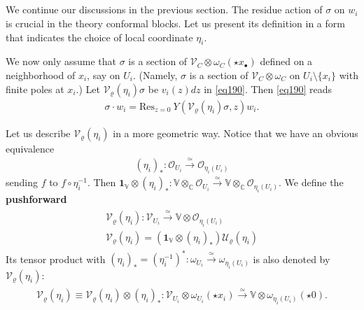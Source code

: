 \documentclass[11pt,b5paper,notitlepage]{article}
\theoremstyle{definition}
\theoremstyle{plain}
\newcommand{\mc}{\mathcal}
\newcommand{\id}{\mathbf{1}}
\newcommand{\Res}{\mathrm{Res}}
\newcommand{\scr}{\mathscr}
\newcommand{\blt}{\bullet}
\newcommand{\Vbb}{\mathbb V}
\newcommand{\Cbb}{\mathbb C}
\numberwithin{equation}{section}
\begin{document}
\subsection{}\label{lb105}


We continue our discussions in the previous section. The residue action of $\sigma$ on $w_i$ is crucial in the theory conformal blocks. Let us present its definition in a form that indicates the choice of local coordinate $\eta_i$.



We now only assume that $\sigma$ is a section of $\scr V_C\otimes\omega_C(\star x_\blt)$ defined on a neighborhood of $x_i$, say on $U_i$. (Namely, $\sigma$ is a section of $\scr V_C\otimes\omega_C$ on $U_i\setminus\{x_i\}$ with finite poles at $x_i$.) Let $\mc V_\varrho(\eta_i)\sigma$ be $v_i(z)dz$ in \eqref{eq190}. Then \eqref{eq190} reads
\begin{gather}
\sigma\cdot w_i=\Res_{z=0} ~Y(\mc V_\varrho(\eta_i)\sigma,z)w_i. \label{eq193}
\end{gather}

Let us  describe $\mc V_\varrho(\eta_i)$ in a more geometric way. Notice that we
have an obvious equivalence
\begin{align*}
(\eta_i)_*:\scr O_{U_i}\xrightarrow{\simeq}\scr O_{\eta_i(U_i)}
\end{align*}
sending $f$ to $f\circ\eta_i^{-1}$. Then $\id_\Vbb\otimes(\eta_i)_*:\Vbb\otimes_\Cbb\scr O_{U_i}\xrightarrow{\simeq}\Vbb\otimes_\Cbb\scr O_{\eta_i(U_i)}$. We define the \textbf{pushforward} \index{V@$\mc V_\varrho(\eta_i),\mc V_\varrho(\varphi)$}
\begin{gather}\label{eq218}
\begin{gathered}
\mc V_\varrho(\eta_i):\scr V_{U_i}\xrightarrow{\simeq}\Vbb\otimes\scr O_{\eta_i(U_i)}\\
\mc V_\varrho(\eta_i)=(\id_\Vbb\otimes(\eta_i)_*)\mc U_\varrho(\eta_i)
\end{gathered}
\end{gather}
Its tensor product with $(\eta_i)_*=(\eta_i^{-1})^*:\omega_{U_i}\xrightarrow{\simeq}\omega_{\eta_i(U_i)}$ is also denoted by $\mc V_\varrho(\eta_i)$:
\begin{gather}
\begin{gathered}
\mc V_\varrho(\eta_i)\equiv \mc V_\varrho(\eta_i)\otimes(\eta_i)_*:\scr V_{U_i}\otimes\omega_{U_i}(\star x_i)\xrightarrow{\simeq}\Vbb\otimes\omega_{\eta_i(U_i)}(\star 0).
\end{gathered}
\end{gather}
\end{document}
